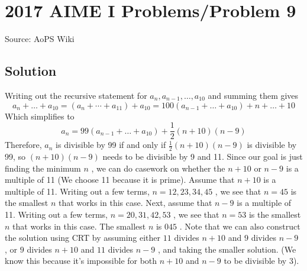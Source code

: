 \documentclass[12pt]{article}
\begin{document}
\section*{{2017 AIME I Problems/Problem 9}}
Source: AoPS Wiki

\subsection*{Solution}
Writing out the recursive statement for $a_n, a_{n-1}, \dots, a_{10}$ and summing them gives \[a_n+\dots+a_{10}=(a_n+\cdots+a_{11})+a_{10}=100(a_{n-1}+\dots+a_{10})+n+\dots+10\] Which simplifies to \[a_n=99(a_{n-1}+\dots+a_{10})+\frac{1}{2}(n+10)(n-9)\] Therefore, $a_n$ is divisible by 99 if and only if $\frac{1}{2}(n+10)(n-9)$ is divisible by 99, so $(n+10)(n-9)$ needs to be divisible by 9 and 11. Since our goal is just finding the minimum $n$ , we can do casework on whether the $n+10$ or $n-9$ is a multiple of 11 (We choose 11 because it is prime). Assume that $n+10$ is a multiple of 11. Writing out a few terms, $n=12, 23, 34, 45$ , we see that $n=45$ is the smallest $n$ that works in this case. Next, assume that $n-9$ is a multiple of 11. Writing out a few terms, $n=20, 31, 42, 53$ , we see that $n=53$ is the smallest $n$ that works in this case. The smallest $n$ is $\boxed{045}$ . Note that we can also construct the solution using CRT by assuming either $11$ divides $n+10$ and $9$ divides $n-9$ , or $9$ divides $n+10$ and $11$ divides $n-9$ , and taking the smaller solution. (We know this because it's impossible for both $n+10$ and $n-9$ to be divisible by 3).
\end{document}
